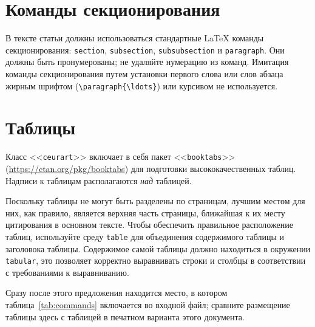 \documentclass[
12pt,
polyglossia,   %
firacode,    %
wordmath,      %
russian        %
]{isdctart}
\begin{document}
\section{Команды секционирования}

В тексте статьи должны использоваться стандартные \LaTeX{} команды секционирования: \verb|section|, \verb|subsection|, \verb|subsubsection| и \verb|paragraph|. Они должны быть пронумерованы; не удаляйте нумерацию из команд. Имитация команды секционирования путем установки первого слова или слов абзаца жирным шрифтом (\verb|\paragraph{\ldots}|) или курсивом не используется.

\section{Таблицы}

Класс <<\verb|ceurart|>> включает в себя пакет <<\verb|booktabs|>> (\url{https://ctan.org/pkg/booktabs}) для подготовки высококачественных таблиц.  Надписи к таблицам располагаются \textit{над} таблицей.

Поскольку таблицы не могут быть разделены по страницам, лучшим местом для них, как правило, является верхняя часть страницы, ближайшая к их месту цитирования в основном тексте. Чтобы обеспечить правильное расположение таблиц, используйте среду \verb|table| для объединения содержимого таблицы и заголовока таблицы. Содержимое самой таблицы должно находиться в окружении \verb|tabular|, это позволяет корректно выравнивать строки и столбцы в соответствии с требованиями к выравниванию.

Сразу после этого предложения находится место, в котором таблица~\ref{tab:commands} включается во входной файл; сравните размещение таблицы здесь с таблицей в печатном варианта этого документа.

\end{document}
